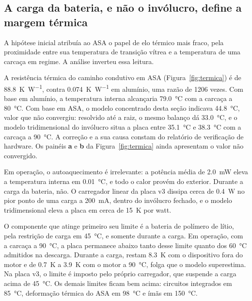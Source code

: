 \documentclass[11pt,a4paper]{article}
\begin{document}
\subsection{A carga da bateria, e não o invólucro, define a margem térmica}
\label{ssec:termica}

A hipótese inicial atribuía ao ASA o papel de elo térmico mais fraco, pela proximidade
entre sua temperatura de transição vítrea e a temperatura de uma carcaça em regime. A
análise inverteu essa leitura.

A resistência térmica do caminho condutivo em ASA (Figura~\ref{fig:termica}) é de \SI{88,8}{\kelvin\per\watt}, contra
\SI{0,074}{\kelvin\per\watt} em alumínio, uma razão de \num{1206} vezes. Com base em
alumínio, a temperatura interna alcançaria \SI{79,0}{\celsius} com a carcaça a
\SI{80}{\celsius}. Com base em ASA, o modelo concentrado desta seção indicava
\SI{44,8}{\celsius}, valor que não convergiu: resolvido até a raiz, o mesmo balanço dá
\SI{33,0}{\celsius}, e o modelo tridimensional do invólucro situa a placa entre
\SI{35,1}{\celsius} e \SI{38,3}{\celsius} com a carcaça a \SI{90}{\celsius}. A correção e
a sua causa constam do relatório de verificação de hardware. Os painéis \textbf{a} e
\textbf{b} da Figura~\ref{fig:termica} ainda apresentam o valor não convergido.

Em operação, o autoaquecimento é irrelevante: a potência média de \SI{2,0}{\milli\watt}
eleva a temperatura interna em \SI{0,01}{\celsius}, e todo o calor provém do exterior.
Durante a carga da bateria, não. O carregador linear da placa v3 dissipa cerca de
\SI{0,4}{\watt} no pior ponto de uma carga a \SI{200}{\milli\ampere}, dentro do invólucro
fechado, e o modelo tridimensional eleva a placa em cerca de \SI{15}{\kelvin} por watt.

O componente que atinge primeiro seu limite é a bateria de polímero de lítio, pela
restrição de carga em \SI{45}{\celsius}, e somente durante a carga. Em operação, com a
carcaça a \SI{90}{\celsius}, a placa permanece abaixo tanto desse limite quanto dos
\SI{60}{\celsius} admitidos na descarga. Durante a carga, restam \SI{8,3}{\kelvin} com o
dispositivo fora do motor e de \SI{0,7}{\kelvin} a \SI{3,9}{\kelvin} com o motor a
\SI{90}{\celsius}, folga que o modelo superestima. Na placa v3, o limite é imposto pelo
próprio carregador, que suspende a carga acima de \SI{45}{\celsius}. Os demais limites
ficam bem acima: circuitos integrados em \SI{85}{\celsius}, deformação térmica do ASA em
\SI{98}{\celsius} e ímãs em \SI{150}{\celsius}.
\end{document}

